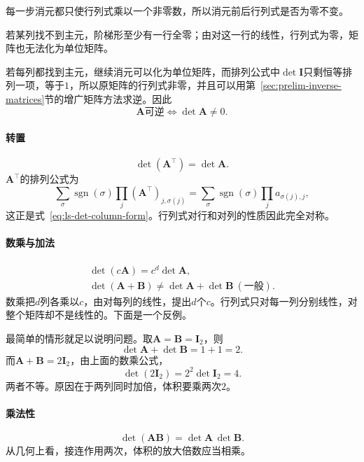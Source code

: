 每一步消元都只使行列式乘以一个非零数，所以消元前后行列式是否为零不变。

若某列找不到主元，阶梯形至少有一行全零；由对这一行的线性，行列式为零，矩阵也无法化为单位矩阵。

若每列都找到主元，继续消元可以化为单位矩阵，而排列公式中$\det\bm I$只剩恒等排列一项，等于$1$，所以原矩阵的行列式非零，并且可以用第~\ref{sec:prelim-inverse-matrices}节的增广矩阵方法求逆。因此
\begin{equation}
 \bm A\text{可逆}\iff\det\bm A\neq0.
 \label{eq:ls-det-invertible-criterion}
\end{equation}

\paragraph{转置}
\[
 \det(\bm A^\top)=\det\bm A.
\]
$\bm A^\top$的排列公式为
\[
 \sum_\sigma\operatorname{sgn}(\sigma)\prod_j(\bm A^\top)_{j,\sigma(j)}
 =\sum_\sigma\operatorname{sgn}(\sigma)\prod_ja_{\sigma(j),j},
\]
这正是式~\eqref{eq:ls-det-column-form}。行列式对行和对列的性质因此完全对称。

\paragraph{数乘与加法}
\[
\begin{gathered}
\det(c\bm A)=c^d\det\bm A,\\
\det(\bm A+\bm B)\neq\det\bm A+\det\bm B\ (\text{一般}).
\end{gathered}
\]
数乘把$d$列各乘以$c$，由对每列的线性，提出$d$个$c$。行列式只对每一列分别线性，对整个矩阵却不是线性的。下面是一个反例。
\begin{example}[反例：行列式不保持加法]
\label{ex:ls-det-not-additive}
最简单的情形就足以说明问题。取$\bm A=\bm B=\bm I_2$，则
\[
 \det\bm A+\det\bm B=1+1=2.
\]
而$\bm A+\bm B=2\bm I_2$，由上面的数乘公式，
\[
 \det(2\bm I_2)=2^2\det\bm I_2=4.
\]
两者不等。原因在于两列同时加倍，体积要乘两次$2$。
\end{example}

\paragraph{乘法性}
\begin{equation}
 \det(\bm A\bm B)=\det\bm A\,\det\bm B.
 \label{eq:ls-det-multiplicative}
\end{equation}
从几何上看，接连作用两次，体积的放大倍数应当相乘。

